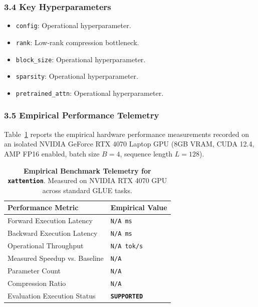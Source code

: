 \subsubsection*{3.4 Key Hyperparameters}
\begin{itemize}
    \item \texttt{config}: Operational hyperparameter.
    \item \texttt{rank}: Low-rank compression bottleneck.
    \item \texttt{block\_size}: Operational hyperparameter.
    \item \texttt{sparsity}: Operational hyperparameter.
    \item \texttt{pretrained\_attn}: Operational hyperparameter.
\end{itemize}

\subsubsection*{3.5 Empirical Performance Telemetry}
Table~\ref{tab:telemetry_xattention} reports the empirical hardware performance measurements recorded on an isolated NVIDIA GeForce RTX 4070 Laptop GPU (8GB VRAM, CUDA 12.4, AMP FP16 enabled, batch size $B=4$, sequence length $L=128$).

\begin{table}[h]
\centering
\small
\caption{\textbf{Empirical Benchmark Telemetry for \texttt{xattention}}. Measured on NVIDIA RTX 4070 GPU across standard GLUE tasks.}
\label{tab:telemetry_xattention}
\begin{tabularx}{\columnwidth}{lX}
\toprule
\textbf{Performance Metric} & \textbf{Empirical Value} \\
\midrule
Forward Execution Latency & \texttt{N/A ms} \\
Backward Execution Latency & \texttt{N/A ms} \\
Operational Throughput & \texttt{N/A tok/s} \\
Measured Speedup vs. Baseline & \texttt{N/A} \\
Parameter Count & \texttt{N/A} \\
Compression Ratio & \texttt{N/A} \\
Evaluation Execution Status & \textbf{\texttt{SUPPORTED}} \\
\bottomrule
\end{tabularx}
\end{table}

